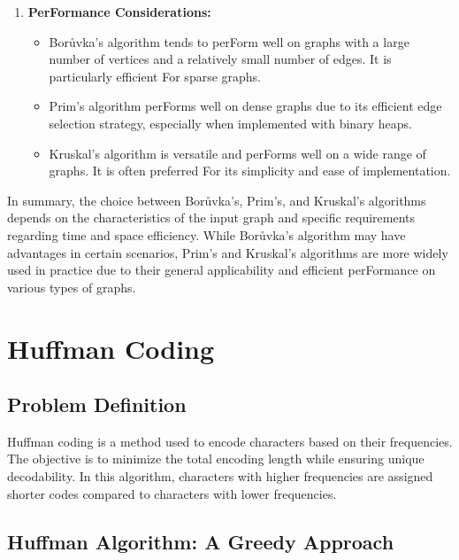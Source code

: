 \documentclass[12pt]{book} %
\begin{document}
\begin{enumerate}
    \item \textbf{PerFormance Considerations:}
    \begin{itemize}
        \item Borůvka's algorithm tends to perForm well on graphs with a large number of vertices and a relatively small number of edges. It is particularly efficient For sparse graphs.
        \item Prim's algorithm perForms well on dense graphs due to its efficient edge selection strategy, especially when implemented with binary heaps.
        \item Kruskal's algorithm is versatile and perForms well on a wide range of graphs. It is often preferred For its simplicity and ease of implementation.
    \end{itemize}
\end{enumerate}

In summary, the choice between Borůvka's, Prim's, and Kruskal's algorithms depends on the characteristics of the input graph and specific requirements regarding time and space efficiency. While Borůvka's algorithm may have advantages in certain scenarios, Prim's and Kruskal's algorithms are more widely used in practice due to their general applicability and efficient perFormance on various types of graphs.


\section{Huffman Coding}
\subsection{Problem Definition}
Huffman coding is a method used to encode characters based on their frequencies. The objective is to minimize the total encoding length while ensuring unique decodability. In this algorithm, characters with higher frequencies are assigned shorter codes compared to characters with lower frequencies. 


\subsection{Huffman Algorithm: A Greedy Approach}
\end{document}
